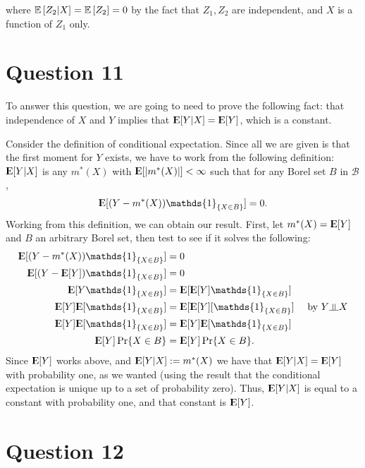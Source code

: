 \documentclass[12pt]{paper}
\newcommand{\Expect}{{\rm I\kern-.3em E}}
\newcommand{\indep}{\rotatebox[origin=c]{90}{$\models$}}
\begin{document}
where $\mathbb{E} \left [ Z_2 \vert X \right ] = \mathbb{E} \left [ Z_2 \right ] = 0$ by the fact that $Z_1, Z_2$ are
independent, and $X$ is a function of $Z_1$ only.

\section*{Question 11}

To answer this question, we are going to need to prove the following fact: that independence of $X$ and $Y$ implies that $\Expect[Y|X]=\Expect[Y]$, which is a constant.

Consider the definition of conditional expectation. Since all we are given is that the first moment for $Y$ exists, we have to work from the following definition: $\Expect[Y|X]$ is any $m^*(X)$ with $\Expect[|m^*(X)|]<\infty$ such that for any Borel set $B$ in $\mathcal{B}$,
\begin{align*}
\Expect[(Y-m^*(X))\mathds{1}_{\{X\in B\}}]=0.
\end{align*}
Working from this definition, we can obtain our result. First, let $m^*(X)=\Expect[Y]$ and $B$ an arbitrary Borel set, then test to see if it solves the following:
\begin{align*}
\Expect[(Y-m^*(X))\mathds{1}_{\{X\in B\}}]&=0\\
\Expect[(Y-\Expect[Y])\mathds{1}_{\{X\in B\}}]&=0\\
\Expect[Y\mathds{1}_{\{X\in B\}}]&=\Expect[\Expect[Y]\mathds{1}_{\{X\in B\}}]\\
\Expect[Y]\Expect[\mathds{1}_{\{X\in B\}}]&=\Expect[\Expect[Y][\mathds{1}_{\{X\in B\}}]&\text{ by } Y \indep X\\
\Expect[Y]\Expect[\mathds{1}_{\{X\in B\}}]&=\Expect[Y]\Expect[\mathds{1}_{\{X\in B\}}]\\
\Expect[Y]\Pr\{X\in B\}&=\Expect[Y]\Pr\{X\in B\}.
\end{align*}
Since $\Expect[Y]$ works above, and $\Expect[Y|X]:=m^*(X)$ we have that $\Expect[Y|X]=\Expect[Y]$ with probability one, as we wanted (using the result that the conditional expectation is unique up to a set of probability zero). Thus, $\Expect[Y|X]$ is equal to a constant with probability one, and that constant is $\Expect[Y]$.

\section*{Question 12}
\end{document}
